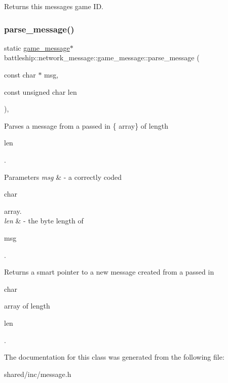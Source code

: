 \begin{DoxyReturn}{Returns}
this message\textquotesingle{}s game ID. 
\end{DoxyReturn}
\mbox{\label{classbattleship_1_1network__message_1_1game__message_a75f29d2d7fddfe52eb7755857a61aec6}} 
\subsubsection{\texorpdfstring{parse\+\_\+message()}{parse\_message()}}
{\footnotesize\ttfamily static \hyperlink{classbattleship_1_1network__message_1_1game__message}{game\+\_\+message}$\ast$ battleship\+::network\+\_\+message\+::game\+\_\+message\+::parse\+\_\+message (\begin{DoxyParamCaption}\item[{const char $\ast$}]{msg,  }\item[{const unsigned char}]{len }\end{DoxyParamCaption})\hspace{0.3cm}{\ttfamily [inline]}, {\ttfamily [static]}}

Parses a message from a passed in \{ array\} of length
\begin{DoxyCode}
len 
\end{DoxyCode}
 .


\begin{DoxyParams}{Parameters}
{\em msg} & -\/ a correctly coded
\begin{DoxyCode}
\textcolor{keywordtype}{char} 
\end{DoxyCode}
 array. \\
\hline
{\em len} & -\/ the byte length of
\begin{DoxyCode}
msg 
\end{DoxyCode}
 .\\
\hline
\end{DoxyParams}
\begin{DoxyReturn}{Returns}
a smart pointer to a new message created from a passed in 
\begin{DoxyCode}
\textcolor{keywordtype}{char} 
\end{DoxyCode}
 array of length
\begin{DoxyCode}
len 
\end{DoxyCode}
 . 
\end{DoxyReturn}


The documentation for this class was generated from the following file\+:\begin{DoxyCompactItemize}
\item 
shared/inc/message.\+h\end{DoxyCompactItemize}

